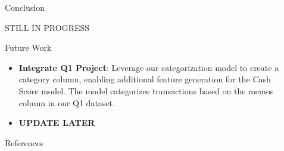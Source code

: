 \documentclass[final]{beamer}
\newlength{\sepwidth}
\newlength{\colwidth}
\newcommand{\separatorcolumn}{\begin{column}{\sepwidth}\end{column}}
\begin{document}
\begin{frame}[t]
\begin{columns}[t]
\begin{column}{\colwidth}
  \begin{block}{Conclusion}

    STILL IN PROGRESS

  \end{block}

  \begin{block}{Future Work}

    \begin{itemize}
        \item \textbf{Integrate Q1 Project}: Leverage our categorization model to create a category column, enabling additional feature generation for the Cash Score model. The model categorizes transactions based on the memos column in our Q1 dataset.
        \item \textbf{UPDATE LATER}
    \end{itemize}

  \end{block}

  \begin{block}{References}

    \nocite{*}

  \end{block}

\end{column}

\separatorcolumn
\end{columns}
\end{frame}
\end{document}

